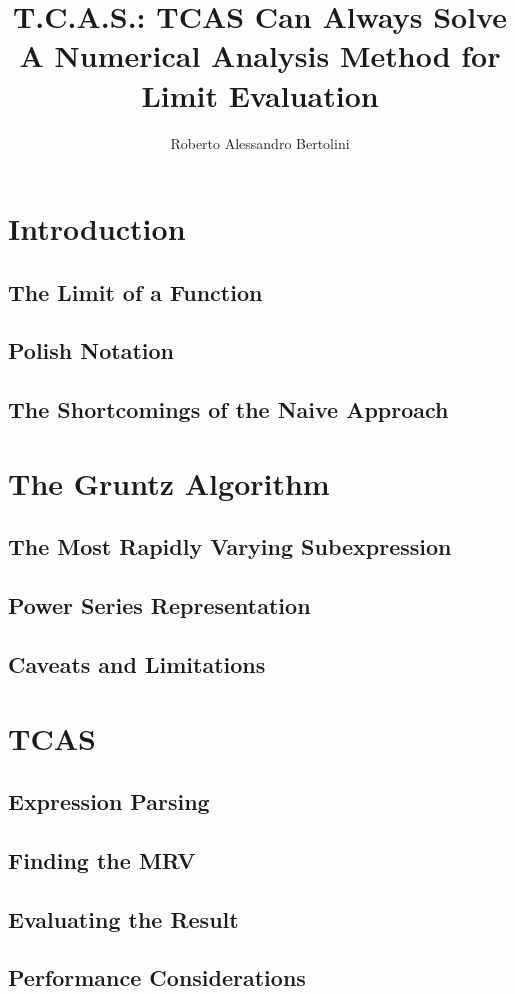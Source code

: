 \documentclass{article}
\title{T.C.A.S.: TCAS Can Always Solve \\
		\large A Numerical Analysis Method for Limit Evaluation}
\author{Roberto Alessandro Bertolini}
\date{}
\affil{Liceo Nervi Ferrari - Morbegno}
\begin{document}
	\maketitle
	
	\begin{abstract}
		
	\end{abstract}

	\tableofcontents
	
	\newpage	
	
	\section{Introduction}
	
	\subsection{The Limit of a Function}
	
	\subsection{Polish Notation}
	
	\subsection{The Shortcomings of the Naive Approach}
	
	\section{The Gruntz Algorithm}
	
	\subsection{The Most Rapidly Varying Subexpression}
	
	\subsection{Power Series Representation}
	
	\subsection{Caveats and Limitations}
	
	\section{TCAS}
	
	\subsection{Expression Parsing}
	
	\subsection{Finding the MRV}
	
	\subsection{Evaluating the Result}
	
	\subsection{Performance Considerations}
	
	\printbibliography
	
\end{document}

